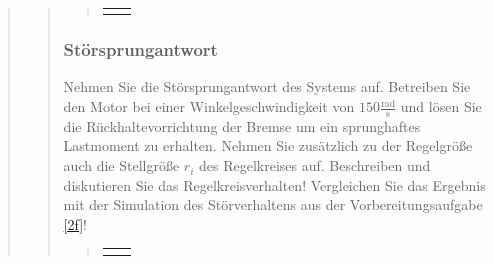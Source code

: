 \begin{quote}
\begin{quote}
\begin{quote}
\begin{center}
\begin{tabular}{ll}
\begin{minipage}{0.6\textwidth}
            \end{minipage}
            
        \end{tabular}
        \end{center}
        
        
        
        
        
        
        
        
                    
        \end{quote}
        
        
        \subsubsection{Störsprungantwort}
        Nehmen Sie die Störsprungantwort des Systems auf. Betreiben Sie den Motor bei
        einer Winkelgeschwindigkeit von $150 \mathrm{\frac{rad}{s}}$ und lösen Sie die Rückhaltevorrichtung
        der Bremse um ein sprunghaftes Lastmoment zu erhalten. Nehmen Sie zusätzlich zu der Regelgröße auch die Stellgröße
        $r_i$ des Regelkreises auf. Beschreiben und diskutieren Sie das Regelkreisverhalten! Vergleichen Sie das Ergebnis mit der
        Simulation des Störverhaltens aus der Vorbereitungsaufgabe \ref{2f}!
        
        \begin{quote}
            
        \begin{center}
        \begin{tabular}{ll}
        
        \hspace{-4.5cm}
            \begin{minipage}{0.6\textwidth}
                

\end{minipage}
\end{tabular}
\end{center}
\end{quote}
\end{quote}
\end{quote}
